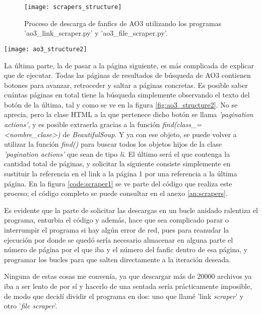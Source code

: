 \documentclass{pre-tfg}
\newcommand{\refToLinkScraperCode}{\ref{an:scrapers}}
\begin{document}
\begin{figure}
	\texttt{[image: scrapers\_structure]}
	\caption{Proceso de descarga de fanfics de AO3 utilizando los programas 'ao3\_link\_scraper.py' y 'ao3\_file\_scraper.py'.}
	\label{fig:scrapers_structure}
	\centering
\end{figure}


\begin{SCfigure}
	\caption{Navegación de páginas de búsqueda de AO3. Todos los botones vienen con su número de página, y se puede ver cuál es la última}
	\label{fig:ao3_structure2}
	\texttt{[image: ao3\_structure2]}
\end{SCfigure}

La última parte, la de pasar a la página siguiente, es más complicada de explicar que de ejecutar. Todas las páginas de resultados de búsqueda de AO3 contienen botones para avanzar, retroceder y saltar a páginas concretas. Es posible saber cuántas páginas en total tiene la búsqueda simplemente observando el texto del botón de la última, tal y como se ve en la figura \ref{fig:ao3_structure2}. No se aprecia, pero la clase HTML a la que pertenece dicho botón se llama \textit{'pagination actions'}, y es posible extraerla gracias a la función \textit{find(class\_=<nombre\_clase>)} de \textit{BeautifulSoup}. Y ya con ese objeto, se puede volver a utilizar la función \textit{find()} para buscar todos los objetos hijos de la clase \textit{'pagination actions'} que sean de tipo \textit{li}. El último será el que contenga la cantidad total de páginas, y solicitar la siguiente consiste simplemente en sustituir la referencia en el link a la página 1 por una referencia a la última página. En la figura \ref{code:scraper1} se ve parte del código que realiza este proceso; el código completo se puede consultar en el anexo \refToLinkScraperCode.

Es evidente que la parte de solicitar las descargas en un bucle anidado ralentiza el programa, enturbia el código y además, hace que sea complicado parar o interrumpir el programa si hay algún error de red, pues para reanudar la ejecución por donde se quedó sería necesario almacenar en alguna parte el número de página por el que iba y el número del fanfic dentro de esa página, y programar los bucles para que salten directamente a la iteración deseada.

Ninguna de estas cosas me convenía, ya que descargar más de 20000 archivos ya iba a ser lento de por sí y hacerlo de una sentada sería prácticamente imposible, de modo que decidí dividir el programa en dos: uno que llamé 'link \textit{scraper}' y otro '\textit{file scraper}'.
\end{document}
